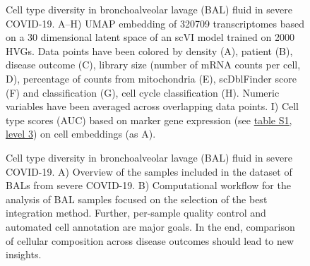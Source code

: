 \documentclass[11pt]{article}
\newcommand{\PATH}{../..}
\begin{document}
\begin{figure}

\caption{Cell type diversity in bronchoalveolar lavage (BAL) fluid in severe COVID-19. A--H) UMAP embedding of 320709 transcriptomes based on a 30 dimensional latent space of an scVI model trained on 2000 HVGs. Data points have been colored by density (A), patient (B), disease outcome (C), library size (number of mRNA counts per cell, D), percentage of counts from mitochondria (E), scDblFinder score (F) and classification (G), cell cycle classification (H). Numeric variables have been averaged across overlapping data points. I) Cell type scores (AUC) based on marker gene expression (see \href{https://nubes.helmholtz-berlin.de/s/id9rrKNeditKMmF}{table S1, level 3}) on cell embeddings (as A).}
\end{figure}

\clearpage

\renewcommand{\figurename}{Supplementary Figure}
\setcounter{figure}{0}

\begin{figure}

\caption{Cell type diversity in bronchoalveolar lavage (BAL) fluid in severe COVID-19. A) Overview of the samples included in the dataset of BALs from severe COVID-19. B) Computational workflow for the analysis of BAL samples focused on the selection of the best integration method. Further, per-sample quality control and automated cell annotation are major goals. In the end, comparison of cellular composition across disease outcomes should lead to new insights.}
\end{figure}
\end{document}
